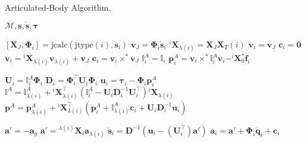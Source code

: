 \begin{algorithm}[h]
    \caption{Articulated-Body Algorithm.}
    \label{alg:aba}
    \begin{algorithmic}[1]
        \Require $\mathcal{M}, \mathbf{s}, \dot{\mathbf{s}}, \boldsymbol{\tau}$

        \State $[\mathbf{X}_J, \boldsymbol{\Phi}_i] = \text{jcalc}(\text{jtype}(i), \dot{\mathbf{s}}_i)$
        \State $\mathrm{\mathbf{v}}_J = \boldsymbol{\Phi}_i \dot{\mathbf{s}}_i$
        \State $^i\mathbf{X}_{\lambda(i)} = \mathbf{X}_J\mathbf{X}_T (i)$
        \State $\mathrm{\mathbf{v}}_i = \mathrm{\mathbf{v}}_J$
        \State $\mathbf{c}_i = \mathbf{0}$
        \Else
        \State $\mathrm{\mathbf{v}}_i = {}^i\mathbf{X} _{\lambda(i)}\mathrm{\mathbf{v}}_{\lambda(i)} + \mathrm{\mathbf{v}}_J$
        \State $\mathbf{c}_i = \mathrm{\mathbf{v}}_i \times ^* \mathrm{\mathbf{v}}_J$
        \EndIf
        \State $\mathbb{I} _i ^A = \mathbb{I} _i$
        \State $\mathbf{p}_i ^A = \mathrm{\mathbf{v}}_i \times^* \mathbb{I} _i ^A \mathrm{\mathbf{v}}_i - ^i\mathbf{X} _0 ^* \mathbf{f}_i $
        \EndFor

        \item[]

        \State $\mathbf{U}_i = \mathbb{I} _i ^A \boldsymbol{\Phi}_i$
        \State $\mathbf{D} _i = \boldsymbol{\Phi} ^\top _i  {} \mathbf{U} _i \boldsymbol{\Phi} _i $
        \State $\mathbf{u}_i = \boldsymbol{\tau}_i - \boldsymbol{\Phi}_i\mathbf{p}_i^A$
        \State $\mathbb{I} ^A = \mathbb{I} ^A _{\lambda (i)} + {} ^i \mathbf{X} _{\lambda (i)} ^\top (\mathbb{I} _i ^A - {}  \mathbf{U} _i  \mathbf{D} ^{-1} _i  {}  \mathbf{U} ^\top _i) {} ^i \mathbf{X} _{\lambda (i)} $
        \State $\mathbf{p} ^A = \mathbf{p} ^A _{\lambda (i)} + {} ^i \mathbf{X} _{\lambda (i)} ^\top (\mathbf{p} ^A_i + \mathbb{I} ^A _{\lambda (i)}  \mathbf{c}_i + {}  \mathbf{U} _i \mathbf{D} ^{-1} _i {} \mathbf{u} _i) $
        \EndIf
        \EndFor

        \item[]

        \State $\mathbf{a}' = -\mathbf{a}_g$
        \Else
        \State $\mathbf{a}' = {}^{\lambda(i)}\mathbf{X}_i \mathbf{a}_{\lambda(i)}$
        \State $\ddot{\mathbf{s}}_i = \mathbf{D}^{-1} (\mathbf{u}_i - (\mathbf{U}_i^\top)\mathbf{a}')$
        \State $\mathbf{a}_i = \mathbf{a}' + \boldsymbol{\Phi}_i\mathbf{\ddot{q}}_i + \mathbf{c} _i$
        \EndIf
        \EndFor
    \end{algorithmic}
\end{algorithm}
